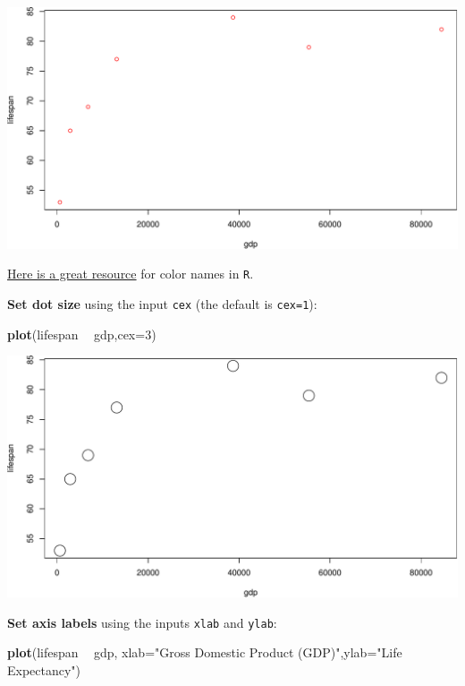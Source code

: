 \documentclass[
]{book}
\newenvironment{Shaded}{\begin{snugshade}}{\end{snugshade}}
\newcommand{\DataTypeTok}[1]{\textcolor[rgb]{0.13,0.29,0.53}{#1}}
\newcommand{\DecValTok}[1]{\textcolor[rgb]{0.00,0.00,0.81}{#1}}
\newcommand{\KeywordTok}[1]{\textcolor[rgb]{0.13,0.29,0.53}{\textbf{#1}}}
\newcommand{\NormalTok}[1]{#1}
\newcommand{\OperatorTok}[1]{\textcolor[rgb]{0.81,0.36,0.00}{\textbf{#1}}}
\newcommand{\StringTok}[1]{\textcolor[rgb]{0.31,0.60,0.02}{#1}}
\begin{document}
\includegraphics{figures/unnamed-chunk-229-1.pdf}

\href{http://www.stat.columbia.edu/~tzheng/files/Rcolor.pdf?utm_source=twitterfeed\&utm_medium=twitter}{Here is a great resource} for color names in \texttt{R}.

\textbf{Set dot size} using the input \texttt{cex} (the default is \texttt{cex=1}):

\begin{Shaded}
\begin{Highlighting}[]
\KeywordTok{plot}\NormalTok{(lifespan }\OperatorTok{~}\StringTok{ }\NormalTok{gdp,}\DataTypeTok{cex=}\DecValTok{3}\NormalTok{)}
\end{Highlighting}
\end{Shaded}

\includegraphics{figures/unnamed-chunk-230-1.pdf}

\textbf{Set axis labels} using the inputs \texttt{xlab} and \texttt{ylab}:

\begin{Shaded}
\begin{Highlighting}[]
\KeywordTok{plot}\NormalTok{(lifespan }\OperatorTok{~}\StringTok{ }\NormalTok{gdp, }\DataTypeTok{xlab=}\StringTok{"Gross Domestic Product (GDP)"}\NormalTok{,}\DataTypeTok{ylab=}\StringTok{"Life Expectancy"}\NormalTok{)}
\end{Highlighting}
\end{Shaded}
\end{document}
